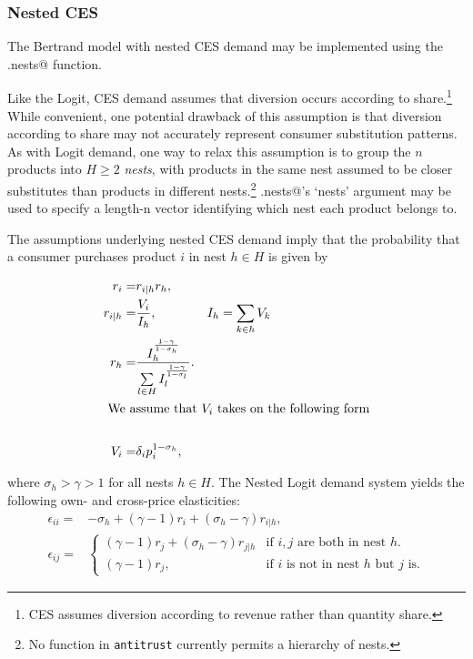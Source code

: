 \documentclass[11pt,numbers=noenddot,pointlessnumbers]{scrreprt}
\newcommand{\atr}{{\tt antitrust}}
\numberwithin{equation}{section}
\begin{document}
\subsubsection{Nested CES}
The Bertrand model with nested CES demand may be implemented using the
\verb@ces.nests@ function.

Like the Logit, CES demand assumes that diversion occurs
according to share.\footnote{CES assumes diversion according to revenue
rather than quantity share.} While convenient, one potential drawback of this
assumption is that diversion according to share may not accurately
represent consumer substitution patterns. As with Logit demand, one way to relax this
assumption is to group the $n$ products
into $H\ge 2$ \emph{nests}, with
products in the same nest assumed to be closer substitutes than
products in different nests.\footnote{No function in \atr{} currently permits
  a hierarchy of nests.} \verb@logit.nests@'s `nests' argument may be used to specify a length-n vector identifying which nest each
product belongs to.

The assumptions underlying
nested CES demand imply that the probability that a consumer
purchases product $i$ in nest $h\in H$ is given by

\begin{align*}
  r_i=& r_{i|h}r_h,&\\
  r_{i|h}=&\frac{V_i}{I_h},& I_h=\sum\limits_{k \in h}V_k\\
  r_{h}=& \frac{I_h^{\frac{1-\gamma}{1-\sigma_h}}}{\sum\limits_{l\in H}I_l^{\frac{1-\gamma}{1-\sigma_l}}}.&\\
  \intertext{ We assume that $V_i$ takes on the following form}\\
  V_i=&\delta_ip_i^{1-\sigma_h},&
\end{align*}

where $\sigma_h>\gamma>1$ for all nests $h\in H$.
The Nested Logit demand system yields the following own- and cross-price elasticities:
\begin{align*}
  \epsilon_{ii}=&
  -\sigma_h + (\gamma-1)r_i + (\sigma_h-\gamma)r_{i|h}, \\
  \epsilon_{ij}=&\begin{cases}
    (\gamma-1)r_j + (\sigma_h-\gamma)r_{j|h} &
    \text{if $i,j$ are both in nest $h$}.\\
    (\gamma-1)r_j, & \text{if $i$ is not in nest $h$ but $j$ is}.
  \end{cases}
\end{align*}
\end{document}
